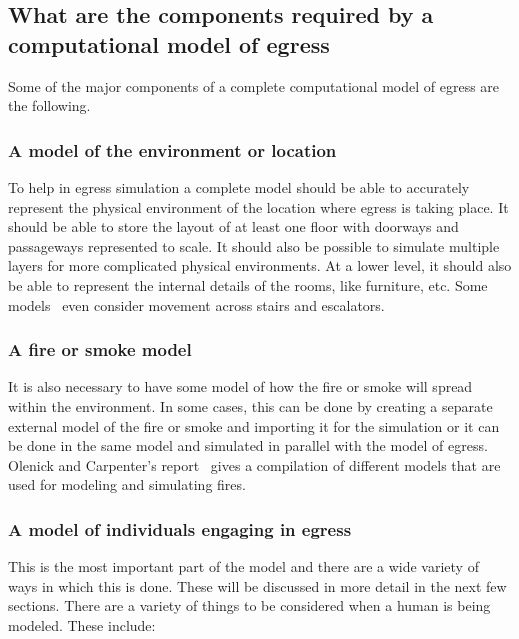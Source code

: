 \subsection{What are the components required by a computational model of egress}
\label{LiteratureReview:ComponentsOfAModel}

Some of the major components of a complete computational model of egress are the following.



\subsubsection{A model of the environment or location}

To help in egress simulation a complete model should be able to accurately represent the physical environment of the location where egress is taking place. It should be able to store the layout of at least one floor with doorways and passageways represented to scale. It should also be possible to simulate multiple layers for more complicated physical environments. At a lower level, it should also be able to represent the internal details of the rooms, like furniture, etc. Some models~\cite{Kinsey:2009tg,Klupfel:2003wa} even consider movement across stairs and escalators.

\subsubsection{A fire or smoke model}

It is also necessary to have some model of how the fire or smoke will spread within the environment. In some cases, this can be done by creating a separate external model of the fire or smoke and importing it for the simulation or it can be done in the same model and simulated in parallel with the model of egress. Olenick and Carpenter's report~\cite{Olenick:2003daa} gives a compilation of different models that are used for modeling and simulating fires.

\subsubsection{A model of individuals engaging in egress}

This is the most important part of the model and there are a wide variety of ways in which this is done. These will be discussed in more detail in the next few sections. There are a variety of things to be considered when a human is being modeled. These include:

